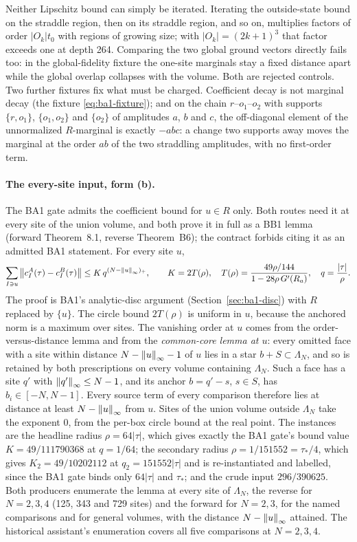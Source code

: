 Neither Lipschitz bound can simply be iterated. Iterating the outside-state
bound on the straddle region, then on its straddle region, and so on,
multiplies factors of order $|O_k|t_0$ with regions of growing size; with
$|O_k|=(2k+1)^3$ that factor exceeds one at depth 264. Comparing the two
global ground vectors directly fails too: in the global-fidelity fixture the
one-site marginals stay a fixed distance apart while the global overlap
collapses with the volume. Both are rejected controls. Two further fixtures
fix what must be charged. Coefficient decay is not marginal decay (the
fixture \eqref{eq:ba1-fixture}); and on the chain $r$--$o_1$--$o_2$ with
supports $\{r,o_1\}$, $\{o_1,o_2\}$ and $\{o_2\}$ of amplitudes $a$, $b$ and
$c$, the off-diagonal element of the unnormalized $R$-marginal is exactly
$-abc$: a change two supports away moves the marginal at the order $ab$ of
the two straddling amplitudes, with no first-order term.

\paragraph{The every-site input, form (b).} The BA1 gate admits the
coefficient bound for $u\in R$ only. Both routes need it at every site of the
union volume, and both prove it in full as a BB1 lemma (forward Theorem~8.1,
reverse Theorem~B6); the contract forbids citing it as an admitted BA1
statement. For every site $u$,
\begin{equation}
 \sum_{I\ni u}\left\lVert c^A_I(\tau)-c^B_I(\tau)\right\rVert\le K\,q^{(N-\left\lVert u\right\rVert_\infty)_+},\qquad
 K=2T(\rho),\quad T(\rho)=\frac{49\rho/144}{1-28\rho\,G'(R_a)},\quad q=\frac{|\tau|}{\rho}.
 \label{eq:bb1-everysite}
\end{equation}
The proof is BA1's analytic-disc argument (Section~\ref{sec:ba1-disc}) with
$R$ replaced by $\{u\}$. The circle bound $2T(\rho)$ is uniform in $u$,
because the anchored norm is a maximum over sites. The vanishing order at $u$
comes from the order-versus-distance lemma and from the \emph{common-core
lemma at $u$}: every omitted face with a site within distance
$N-\left\lVert u\right\rVert_\infty-1$ of $u$ lies in a star $b+S\subset\Lambda_N$, and so is
retained by both prescriptions on every volume containing $\Lambda_N$. Such a
face has a site $q'$ with $\left\lVert q'\right\rVert_\infty\le N-1$, and its anchor
$b=q'-s$, $s\in S$, has $b_i\in[-N,N-1]$. Every source term of every
comparison therefore lies at distance at least $N-\left\lVert u\right\rVert_\infty$ from $u$.
Sites of the union volume outside $\Lambda_N$ take the exponent $0$, from the
per-box circle bound at the real point. The instances are the headline radius
$\rho=64|\tau|$, which gives exactly the BA1 gate's bound value
$K=49/111790368$ at $q=1/64$; the secondary radius $\rho=1/151552=\tau_*/4$,
which gives $K_2=49/10202112$ at $q_2=151552|\tau|$ and is re-instantiated
and labelled, since the BA1 gate binds only $64|\tau|$ and $\tau_*$; and the
crude input $296/390625$. Both producers enumerate the lemma at every site of
$\Lambda_N$, the reverse for $N=2,3,4$ (125, 343 and 729 sites) and the
forward for $N=2,3$, for the named comparisons and for general volumes, with
the distance $N-\left\lVert u\right\rVert_\infty$ attained. The historical assistant's
enumeration covers all five comparisons at $N=2,3,4$.

